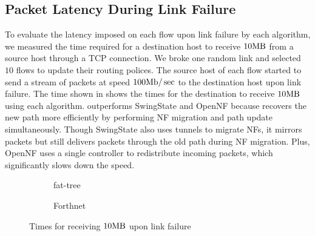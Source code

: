 \subsection{Packet Latency During Link Failure}

To evaluate the latency imposed on each flow upon link failure by each
algorithm, we measured the time required for a destination host to
receive $10\textrm{MB}$ from a source host through a TCP connection. We
broke one random link and selected $10$ flows to update their routing
polices.  The source host of each flow started to send a stream of
packets at speed $100\textrm{Mb}/\sec$ to the destination host upon link
failure. The time shown in  shows the times for
the destination to receive $10\textrm{MB}$ using each
algorithm. \sysname outperforms SwingState and OpenNF because \sysname
recovers the new path more efficiently by performing NF migration and
path update simultaneously.  Though SwingState also uses tunnels to
migrate NFs, it mirrors packets but still delivers packets through
the old path during NF migration.  Plus, OpenNF uses a single
controller to redistribute incoming packets, which significantly slows
down the speed.

\begin{figure}[t]
\centering
 \begin{subfigure}[b]{0.7\columnwidth}
    \resizebox{\textwidth}{!}{\footnotesize{}}
    \caption{fat-tree}
    \label{fig:latency:fat}
  \end{subfigure}
   \begin{subfigure}[b]{0.7\columnwidth}
    \resizebox{\textwidth}{!}{\footnotesize{}}
    \caption{Forthnet}
    \label{fig:latency:forthnet}
  \end{subfigure}
\caption{Times for receiving $10\textrm{MB}$ upon link failure}
\label{fig:latency}
\end{figure}